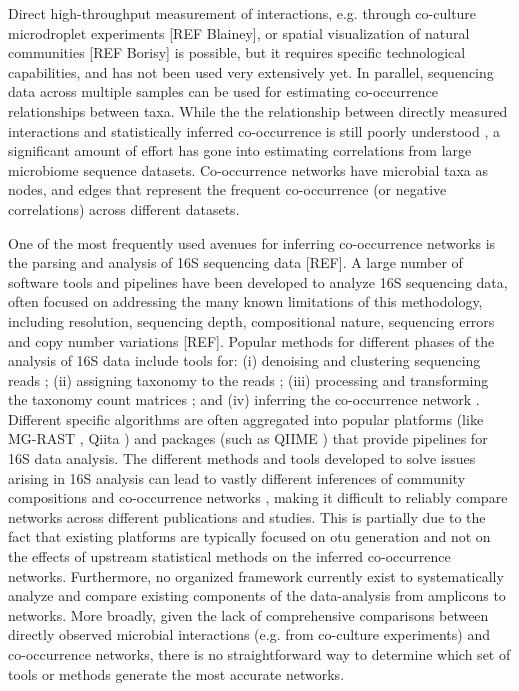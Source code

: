  Direct high-throughput measurement of interactions, e.g. through co-culture microdroplet experiments [REF Blainey], or spatial visualization of natural communities [REF Borisy] is possible, but it requires specific technological capabilities, and has not been used very extensively yet.
 In parallel, sequencing data across multiple samples can be used for estimating co-occurrence relationships between taxa.
 While the the relationship between directly measured interactions and statistically inferred co-occurrence is still poorly understood \cite{Zuniga2017}, a significant amount of effort has gone into estimating correlations from large microbiome sequence datasets.
 Co-occurrence networks have microbial taxa as nodes, and edges that represent the frequent co-occurrence (or negative correlations) across different datasets. 

One of the most frequently used avenues for inferring co-occurrence networks is the parsing and analysis of 16S sequencing data [REF]. A large number of software tools and pipelines have been developed to analyze 16S sequencing data, often focused on addressing the many known limitations of this methodology, including resolution, sequencing depth, compositional nature, sequencing errors and copy number variations [REF]. Popular methods for different phases of the analysis of 16S data include tools for: (i) denoising and clustering sequencing reads \cite{Caporaso2010,Callahan2016}; (ii) assigning taxonomy to the reads \cite{DeSantis2006,Quast2012}; (iii) processing and transforming the taxonomy count matrices \cite{Weiss2015}; and (iv) inferring the co-occurrence network \cite{Cougoul2019,Kurtz2015}.
Different specific algorithms are often aggregated into popular platforms (like MG-RAST \cite{Keegan2016}, Qiita \cite{qiita}) and packages (such as QIIME \cite{Caporaso2010}) that provide pipelines for 16S data analysis.
The different methods and tools developed to solve issues arising in 16S analysis can lead to vastly different inferences of community compositions and co-occurrence networks \cite{Golob2017,Weiss2016}, making it difficult to reliably compare networks across different publications and studies.
 This is partially due to the fact that existing platforms are typically focused on \ac{otu} generation and not on the effects of upstream statistical methods on the inferred co-occurrence networks.
 Furthermore, no organized framework currently exist to systematically analyze and compare existing components of the data-analysis from amplicons to networks.
  More broadly, given the lack of comprehensive comparisons between directly observed microbial interactions (e.g. from co-culture experiments) and co-occurrence networks, there is no straightforward way to determine which set of tools or methods generate the most accurate networks.
 

